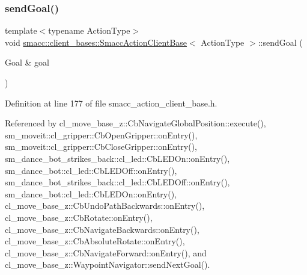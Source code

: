 \mbox{\label{classsmacc_1_1client__bases_1_1SmaccActionClientBase_a9c47a5094ac8afb01680307fe5eca922}} 
\subsubsection{\texorpdfstring{send\+Goal()}{sendGoal()}}
{\footnotesize\ttfamily template$<$typename Action\+Type$>$ \\
void \hyperlink{classsmacc_1_1client__bases_1_1SmaccActionClientBase}{smacc\+::client\+\_\+bases\+::\+Smacc\+Action\+Client\+Base}$<$ Action\+Type $>$\+::send\+Goal (\begin{DoxyParamCaption}\item[{Goal \&}]{goal }\end{DoxyParamCaption})\hspace{0.3cm}{\ttfamily [inline]}}



Definition at line 177 of file smacc\+\_\+action\+\_\+client\+\_\+base.\+h.



Referenced by cl\+\_\+move\+\_\+base\+\_\+z\+::\+Cb\+Navigate\+Global\+Position\+::execute(), sm\+\_\+moveit\+::cl\+\_\+gripper\+::\+Cb\+Open\+Gripper\+::on\+Entry(), sm\+\_\+moveit\+::cl\+\_\+gripper\+::\+Cb\+Close\+Gripper\+::on\+Entry(), sm\+\_\+dance\+\_\+bot\+\_\+strikes\+\_\+back\+::cl\+\_\+led\+::\+Cb\+L\+E\+D\+On\+::on\+Entry(), sm\+\_\+dance\+\_\+bot\+::cl\+\_\+led\+::\+Cb\+L\+E\+D\+Off\+::on\+Entry(), sm\+\_\+dance\+\_\+bot\+\_\+strikes\+\_\+back\+::cl\+\_\+led\+::\+Cb\+L\+E\+D\+Off\+::on\+Entry(), sm\+\_\+dance\+\_\+bot\+::cl\+\_\+led\+::\+Cb\+L\+E\+D\+On\+::on\+Entry(), cl\+\_\+move\+\_\+base\+\_\+z\+::\+Cb\+Undo\+Path\+Backwards\+::on\+Entry(), cl\+\_\+move\+\_\+base\+\_\+z\+::\+Cb\+Rotate\+::on\+Entry(), cl\+\_\+move\+\_\+base\+\_\+z\+::\+Cb\+Navigate\+Backwards\+::on\+Entry(), cl\+\_\+move\+\_\+base\+\_\+z\+::\+Cb\+Absolute\+Rotate\+::on\+Entry(), cl\+\_\+move\+\_\+base\+\_\+z\+::\+Cb\+Navigate\+Forward\+::on\+Entry(), and cl\+\_\+move\+\_\+base\+\_\+z\+::\+Waypoint\+Navigator\+::send\+Next\+Goal().


